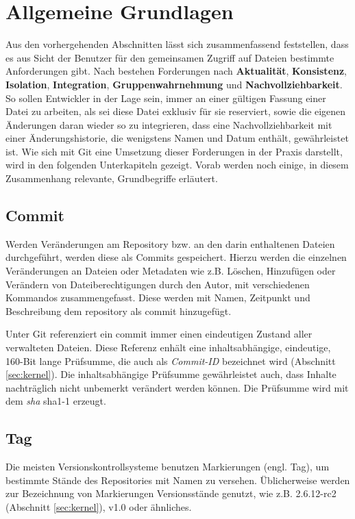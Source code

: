\section{Allgemeine Grundlagen}\label{sec:Grundlagen}
Aus den vorhergehenden Abschnitten lässt sich zusammenfassend feststellen, dass
es aus Sicht der Benutzer für den gemeinsamen Zugriff auf Dateien bestimmte
Anforderungen gibt. Nach \cite[S.~37]{hagen:1678} bestehen Forderungen nach
\textbf{Aktualität}, \textbf{Konsistenz}, \textbf{Isolation},
\textbf{Integration}, \textbf{Gruppenwahrnehmung} und
\textbf{Nachvollziehbarkeit}. So sollen Entwickler in der Lage sein, immer an
einer gültigen Fassung einer Datei zu arbeiten, als sei diese Datei exklusiv für
sie reserviert, sowie die eigenen Änderungen daran wieder so zu integrieren, dass
eine Nachvollziehbarkeit mit einer Änderungshistorie, die wenigstens Namen und
Datum enthält, gewährleistet ist. Wie sich mit Git eine Umsetzung dieser
Forderungen in der Praxis darstellt, wird in den folgenden Unterkapiteln
gezeigt. Vorab werden noch einige, in diesem Zusammenhang relevante,
Grundbegriffe erläutert.

\subsection{Commit}\label{sec:commit}
Werden Veränderungen am Repository bzw. an den darin enthaltenen
Dateien durchgeführt, werden diese als Commits gespeichert. Hierzu werden die einzelnen
Veränderungen an Dateien oder Metadaten wie z.B. Löschen, Hinzufügen oder Verändern
von Dateiberechtigungen durch den Autor, mit verschiedenen Kommandos
zusammengefasst. Diese werden mit Namen, Zeitpunkt und Beschreibung dem
\gls{repository} als \gls{commit} hinzugefügt. \cite[S.~20]{gitosp}

Unter Git referenziert ein \gls{commit} immer einen eindeutigen Zustand aller
verwalteten Dateien. Diese Referenz enhält eine inhaltsabhängige, eindeutige,
160-Bit lange Prüfsumme, die auch als \textit{Commit-ID} bezeichnet
wird (Abschnitt \ref{sec:kernel}). Die inhaltsabhängige Prüfsumme gewährleistet
auch, dass Inhalte nachträglich nicht unbemerkt verändert werden können. Die
Prüfsumme wird mit dem \textit{\gls{sha}} \acrshort{sha1}-1
erzeugt. \cite[S.~20-21]{gitosp}

\subsection{Tag}\label{sec:tag}
Die meisten Versionskontrollsysteme benutzen Markierungen (engl. Tag), um
bestimmte Stände des Repositories mit Namen zu versehen. Üblicherweise werden
zur Bezeichnung von Markierungen Versionsstände genutzt, wie z.B.
2.6.12-rc2 (Abschnitt \ref{sec:kernel}), v1.0 oder ähnliches. \cite[S.~48]{progit}

